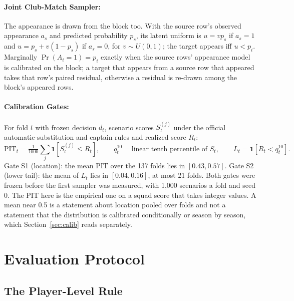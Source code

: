 \documentclass[11pt,a4paper]{article}
\begin{document}
\paragraph{Joint Club-Match Sampler:} The appearance is drawn from the block too. With the source row's observed appearance $a_s$ and predicted probability $p_s$, its latent uniform is $u = v p_s$ if $a_s = 1$ and $u = p_s + v(1-p_s)$ if $a_s = 0$, for $v \sim U(0,1)$; the target appears iff $u < p_i$. Marginally $\Pr(A_i = 1) = p_i$ exactly when the source rows' appearance model is calibrated on the block; a target that appears from a source row that appeared takes that row's paired residual, otherwise a residual is re-drawn among the block's appeared rows.

\paragraph{Calibration Gates:} For fold $t$ with frozen decision $d_t$, scenario scores $S_t^{(j)}$ under the official automatic-substitution and captain rules and realized score $R_t$:
\begin{equation}
\mathrm{PIT}_t = \tfrac{1}{1000}\sum_j \mathbf{1}[S_t^{(j)} \le R_t],\qquad q^{10}_t = \text{linear tenth percentile of } S_t,\qquad L_t = \mathbf{1}[R_t < q^{10}_t].
\end{equation}
Gate S1 (location): the mean PIT over the 137 folds lies in $[0.43, 0.57]$. Gate S2 (lower tail): the mean of $L_t$ lies in $[0.04, 0.16]$, at most 21 folds. Both gates were frozen before the first sampler was measured, with 1{,}000 scenarios a fold and seed 0. The PIT here is the empirical one on a squad score that takes integer values. A mean near 0.5 is a statement about location pooled over folds and not a statement that the distribution is calibrated conditionally or season by season, which Section~\ref{sec:calib} reads separately.

\section{Evaluation Protocol}
\label{sec:protocol}

\subsection{The Player-Level Rule}
\label{sec:rule}
\end{document}
